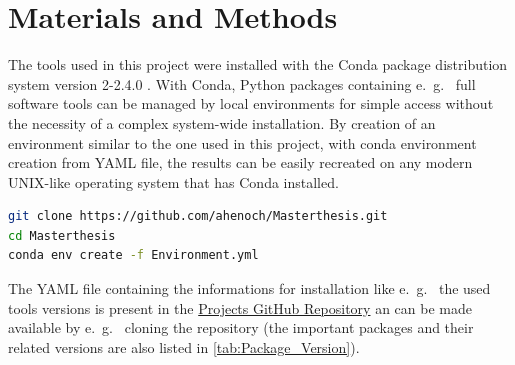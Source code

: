 \chapter{Materials and Methods} \label{chap:Materials_and_Methods}

The tools used in this project were installed with the Conda package distribution system version 2-2.4.0 \autocite{anaconda_software_distribution_anaconda_2020}. With Conda, Python packages containing e.~g.~ full software tools can be managed by local environments for simple access without the necessity of a complex system-wide installation. By creation of an environment similar to the one used in this project, with conda environment creation from YAML file, the results can be easily recreated on any modern UNIX-like operating system that has Conda installed. 

\begin{lstlisting}[language=sh]
git clone https://github.com/ahenoch/Masterthesis.git
cd Masterthesis
conda env create -f Environment.yml
\end{lstlisting}  

The YAML file containing the informations for installation like e.~g.~ the used tools versions is present in the \href{https://github.com/ahenoch/Masterthesis.git}{Projects GitHub Repository} an can be made available by e.~g.~ cloning the repository (the important packages and their related versions are also listed in \autoref{tab:Package_Version}).

\begin{table}[!hbt]
    \centering
    \caption[Package Version]{\textbf{Package Version.} The packages that need to be installed by Conda in a specific version for the pipeline to work as expected are listed in this table. Other related packages necessary for execution of the listed ones are meanwhile installed automatically by Conda.}
    \label{tab:Package_Version}
\end{table}

